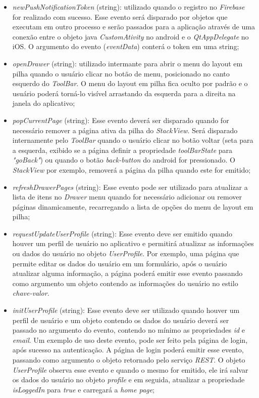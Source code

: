 \begin{itemize}
\begin{itemize}
		\item \textit{newPushNotificationToken} (string): utilizado quando o registro no \textit{Firebase} for realizado com sucesso. Esse evento será disparado por objetos que executam em outro processo e serão passados para a aplicação através de uma conexão entre o objeto java \textit{CustomAtivity} no android e o \textit{QtAppDelegate} no iOS. O argumento do evento (\textit{eventData}) conterá o token em uma string;

		\item \textit{openDrawer} (string): utilizado intermante para abrir o menu do layout em pilha quando o usuário clicar no botão de menu, posicionado no canto esquerdo do \textit{ToolBar}. O menu do layout em pilha fica oculto por padrão e o usuário poderá torná-lo visível arrastando da esquerda para a direita na janela do aplicativo;

		\item \textit{popCurrentPage} (string): Esse evento deverá ser disparado quando for necessário remover a página ativa da pilha do \textit{StackView}. Será disparado internamente pelo \textit{ToolBar} quando o usuário clicar no botão voltar (seta para a esquerda, exibido se a página definir a propriedade \textit{toolBarState} para \textit{"goBack"}) ou quando o botão \textit{back-button} do android for pressionado. O \textit{StackView} por exemplo, removerá a página da pilha quando este for emitido;

		\item \textit{refreshDrawerPages} (string): Esse evento pode ser utilizado para atualizar a lista de itens no \textit{Drawer} menu quando for necessário adicionar ou remover páginas dinamicamente, recarregando a lista de opções do menu de layout em pilha;

		\item \textit{requestUpdateUserProfile} (string): Esse evento deve ser emitido quando houver um perfil de usuário no aplicativo e permitirá atualizar as informações ou dados do usuário no objeto \textit{UserProfile}. Por exemplo, uma página que permite editar os dados do usuário em um formulário, após o usuário atualizar alguma informação, a página poderá emitir esse evento passando como argumento um objeto contendo as informações do usuário no estilo \textit{chave-valor}.

		\item \textit{initUserProfile} (string): Esse evento deve ser utilizado quando houver um perfil de usuário e um objeto contendo os dados do usuário deverá ser passado no argumento do evento, contendo no mínimo as propriedades \textit{id} e \textit{email}. Um exemplo de uso deste evento, pode ser feito pela página de login, após sucesso na autenticação. A página de login poderá emitir esse evento, passando como argumento o objeto retornado pelo serviço \textit{REST}. O objeto \textit{UserProfile} observa esse evento e quando o mesmo for emitido, ele irá salvar os dados do usuário no objeto \textit{profile} e em seguida, atualizar a propriedade \textit{isLoggedIn} para \textit{true} e carregará a \textit{home page};


\end{itemize}
\end{itemize}
